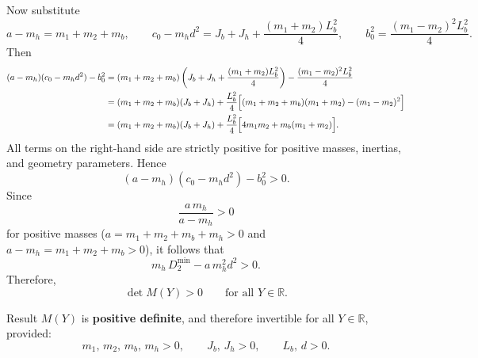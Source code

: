 \documentclass[11pt]{article}
\begin{document}
Now substitute
\begin{equation}
    a-m_h = m_1+m_2+m_b,
    \qquad
    c_0 - m_h d^2 = J_b + J_h + \frac{(m_1+m_2)L_b^2}{4},
    \qquad
    b_0^2 = \frac{(m_1-m_2)^2L_b^2}{4}.
\end{equation}
Then
\begin{align}
    (a-m_h)(c_0 - m_h d^2) - b_0^2
    &= (m_1+m_2+m_b)\left(J_b + J_h + \frac{(m_1+m_2)L_b^2}{4}\right)
       - \frac{(m_1-m_2)^2L_b^2}{4} \notag\\
    &= (m_1+m_2+m_b)(J_b+J_h)
       + \frac{L_b^2}{4}\Bigl[(m_1+m_2+m_b)(m_1+m_2) - (m_1-m_2)^2\Bigr] \notag\\
    &= (m_1+m_2+m_b)(J_b+J_h)
       + \frac{L_b^2}{4}\Bigl[4m_1m_2 + m_b(m_1+m_2)\Bigr].
\end{align}
All terms on the right-hand side are strictly positive for positive masses, inertias, and geometry parameters. Hence
\begin{equation}
    (a-m_h)(c_0 - m_h d^2) - b_0^2 > 0.
\end{equation}
Since
\[
\frac{a\,m_h}{a-m_h} > 0
\]
for positive masses (\(a=m_1+m_2+m_b+m_h>0\) and \(a-m_h=m_1+m_2+m_b>0\)), it follows that
\begin{equation}
    m_h\,D_2^{\min} - a\,m_h^2 d^2 > 0.
\end{equation}
Therefore,
\begin{equation}
    \det M(Y) > 0 \qquad \text{for all } Y \in \mathbb{R}.
\end{equation}

\medskip
\begin{resultbox}{Result}
    $M(Y)$ is \textbf{positive definite}, and therefore invertible for all $Y \in \mathbb{R}$,
    provided:
    \[
        m_1,\, m_2,\, m_b,\, m_h > 0, \qquad J_b,\, J_h > 0, \qquad L_b,\, d > 0.
    \]
\end{resultbox}



\end{document}
